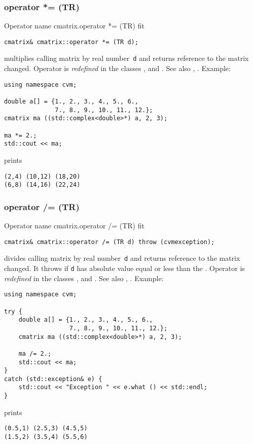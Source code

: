 \subsubsection{operator *= (TR)}
Operator%
\pdfdest name {cmatrix.operator *= (TR)} fit
\begin{verbatim}
cmatrix& cmatrix::operator *= (TR d);
\end{verbatim}
multiplies  calling matrix by  real number~\verb"d"
and returns  reference to
the matrix changed.
Operator is \emph{redefined} in the classes
,  
and .
See also ,
.
Example:
\begin{Verbatim}
using namespace cvm;

double a[] = {1., 2., 3., 4., 5., 6.,
              7., 8., 9., 10., 11., 12.};
cmatrix ma ((std::complex<double>*) a, 2, 3);

ma *= 2.;
std::cout << ma;
\end{Verbatim}
prints
\begin{Verbatim}
(2,4) (10,12) (18,20)
(6,8) (14,16) (22,24)
\end{Verbatim}
\newpage



\subsubsection{operator /= (TR)}
Operator%
\pdfdest name {cmatrix.operator /= (TR)} fit
\begin{verbatim}
cmatrix& cmatrix::operator /= (TR d) throw (cvmexception);
\end{verbatim}
divides  calling matrix by  real number~\verb"d"
and returns  reference to
the matrix changed.
It throws  
if \verb"d" has  absolute value equal or less
than the 
.
Operator is \emph{redefined} in the classes
,  
and .
See also ,
.
Example:
\begin{Verbatim}
using namespace cvm;

try {
    double a[] = {1., 2., 3., 4., 5., 6.,
                  7., 8., 9., 10., 11., 12.};
    cmatrix ma ((std::complex<double>*) a, 2, 3);

    ma /= 2.;
    std::cout << ma;
}
catch (std::exception& e) {
    std::cout << "Exception " << e.what () << std::endl;
}
\end{Verbatim}
prints
\begin{Verbatim}
(0.5,1) (2.5,3) (4.5,5)
(1.5,2) (3.5,4) (5.5,6)
\end{Verbatim}
\newpage




